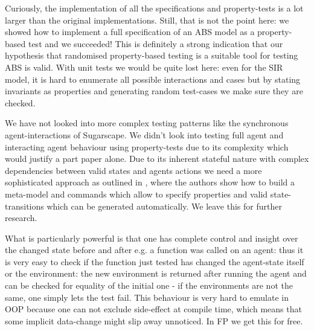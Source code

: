 
Curiously, the implementation of all the specifications and property-tests is a lot larger than the original implementations. Still, that is not the point here: we showed how to implement a full specification of an ABS model as a property-based test and we succeeded! This is definitely a strong indication that our hypothesis that randomised property-based testing is a suitable tool for testing ABS is valid. With unit tests we would be quite lost here: even for the SIR model, it is hard to enumerate all possible interactions and cases but by stating invariants as properties and generating random test-cases we make sure they are checked.

We have not looked into more complex testing patterns like the synchronous agent-interactions of Sugarscape. We didn't look into testing full agent and interacting agent behaviour using property-tests due to its complexity which would justify a part paper alone. Due to its inherent stateful nature with complex dependencies between valid states and agents actions we need a more sophisticated approach as outlined in \cite{de_vries_-depth_2019}, where the authors show how to build a meta-model and commands which allow to specify properties and valid state-transitions which can be generated automatically. We leave this for further research.

What is particularly powerful is that one has complete control and insight over the changed state before and after e.g. a function was called on an agent: thus it is very easy to check if the function just tested has changed the agent-state itself or the environment: the new environment is returned after running the agent and can be checked for equality of the initial one - if the environments are not the same, one simply lets the test fail. This behaviour is very hard to emulate in OOP because one can not exclude side-effect at compile time, which means that some implicit data-change might slip away unnoticed. In FP we get this for free.

